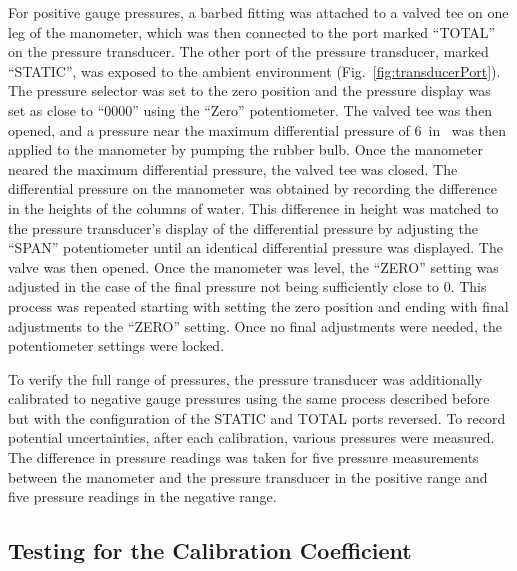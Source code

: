 \documentclass[journal,letterpaper]{IEEEtran}
\begin{document}
For positive gauge pressures, a barbed fitting was attached to a valved tee on one leg of the manometer, which was then connected to the port marked ``TOTAL'' on the pressure transducer.
The other port of the pressure transducer, marked ``STATIC'', was exposed to the ambient environment (Fig.~\ref{fig:transducerPort}).
The pressure selector was set to the zero position and the pressure display was set as close to ``0000'' using the ``Zero'' potentiometer.
The valved tee was then opened, and a pressure near the maximum differential pressure of \qty{6}{in} was then applied to the manometer by pumping the rubber bulb.
Once the manometer neared the maximum differential pressure, the valved tee was closed.
The differential pressure on the manometer was obtained by recording the difference in the heights of the columns of water.
This difference in height was matched to the pressure transducer's display of the differential pressure by adjusting the ``SPAN'' potentiometer until an identical differential pressure was displayed.
The valve was then opened.
Once the manometer was level, the ``ZERO'' setting was adjusted in the case of the final pressure not being sufficiently close to 0.
This process was repeated starting with setting the zero position and ending with final adjustments to the ``ZERO'' setting.
Once no final adjustments were needed, the potentiometer settings were locked.

To verify the full range of pressures, the pressure transducer was additionally calibrated to negative gauge pressures using the same process described before but with the configuration of the STATIC and TOTAL ports reversed.
To record potential uncertainties, after each calibration, various pressures were measured.
The difference in pressure readings was taken for five pressure measurements between the manometer and the pressure transducer in the positive range and five pressure readings in the negative range.

\subsection{Testing for the Calibration Coefficient}
\end{document}

